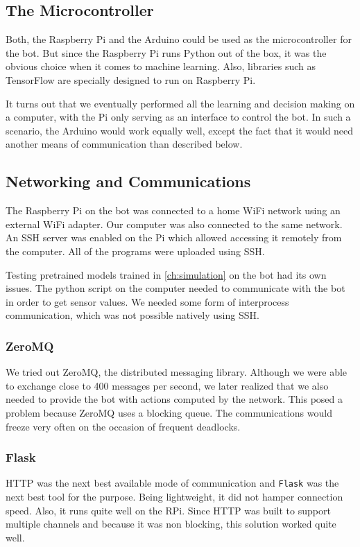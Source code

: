 \documentclass[12pt]{extreport}
\begin{document}
\subsection{The Microcontroller}
Both, the Raspberry Pi and the Arduino could be used as the microcontroller for the bot. But since the Raspberry Pi runs Python out of the box, it was the obvious choice when it comes to machine learning. Also, libraries such as TensorFlow are specially designed to run on Raspberry Pi.

It turns out that we eventually performed all the learning and decision making on a computer, with the Pi only serving as an interface to control the bot. In such a scenario, the Arduino would work equally well, except the fact that it would need another means of communication than described below.

\subsection{Networking and Communications}
The Raspberry Pi on the bot was connected to a home WiFi network using an external WiFi adapter. Our computer was also connected to the same network.
An SSH server was enabled on the Pi which allowed accessing it remotely from the computer. All of the programs were uploaded using SSH.

Testing pretrained models trained in \autoref{ch:simulation} on the bot had its own issues. The python script on the computer needed to communicate with the bot in order to get sensor values. We needed some form of interprocess communication, which was not possible natively using SSH.

\subsubsection{ZeroMQ}
We tried out ZeroMQ, the distributed messaging library. Although we were able to exchange close to 400 messages per second, we later realized that we also needed to provide the bot with actions computed by the network. This posed a problem because ZeroMQ uses a blocking queue. The communications would freeze very often on the occasion of frequent deadlocks.

\subsubsection{Flask}
HTTP was the next best available mode of communication and \texttt{Flask} was the next best tool for the purpose. Being lightweight, it did not hamper connection speed. Also, it runs quite well on the RPi. Since HTTP was built to support multiple channels and because it was non blocking, this solution worked quite well.
\end{document}
